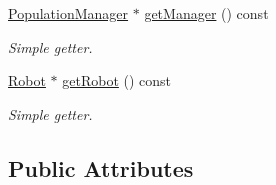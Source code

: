 \begin{DoxyCompactItemize}
\hyperlink{classPopulationManager}{Population\+Manager} $\ast$ \hyperlink{classSocialPlanner_a0b0604374eaf862ddaedcf52a9ab163d}{get\+Manager} () const 
\begin{DoxyCompactList}\small\item\em Simple getter. \end{DoxyCompactList}\item 
\hyperlink{classRobot}{Robot} $\ast$ \hyperlink{classSocialPlanner_a552ff2abf5af651b3adf02b58c144806}{get\+Robot} () const 
\begin{DoxyCompactList}\small\item\em Simple getter. \end{DoxyCompactList}\end{DoxyCompactItemize}
\subsection*{Public Attributes}
